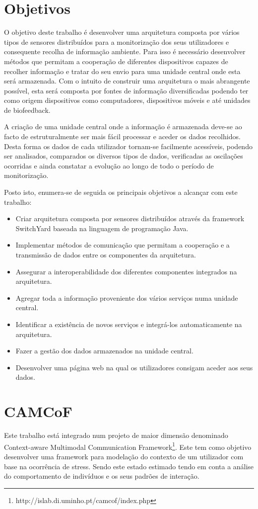 \section{Objetivos}

O objetivo deste trabalho é desenvolver uma arquitetura composta por vários tipos de sensores distribuídos para a monitorização dos seus utilizadores e consequente recolha de informação ambiente. Para isso é necessário desenvolver métodos que permitam a cooperação de diferentes dispositivos capazes de recolher informação e tratar do seu envio para uma unidade central onde esta será armazenada. Com o intuito de construir uma arquitetura o mais abrangente possível, esta será composta por fontes de informação diversificadas podendo ter como origem dispositivos como computadores, dispositivos móveis e até unidades de biofeedback.

A criação de uma unidade central onde a informação é armazenada deve-se ao facto de estruturalmente ser mais fácil processar e aceder os dados recolhidos. Desta forma os dados de cada utilizador tornam-se facilmente acessíveis, podendo ser analisados, comparados os diversos tipos de dados, verificadas as oscilações ocorridas e ainda constatar a evolução ao longo de todo o período de monitorização.

Posto isto, enumera-se de seguida os principais objetivos a alcançar com este trabalho:
\begin{itemize}
  \item Criar arquitetura composta por sensores distribuídos através da framework SwitchYard baseada na linguagem de programação Java.
  \item Implementar métodos de comunicação que permitam a cooperação e a transmissão de dados entre os componentes da arquitetura.
  \item Assegurar a interoperabilidade dos diferentes componentes integrados na arquitetura.
  \item Agregar toda a informação proveniente dos vários serviços numa unidade central.
  \item Identificar a existência de novos serviços e integrá-los automaticamente na arquitetura.
  \item Fazer a gestão dos dados armazenados na unidade central.
  \item Desenvolver uma página web na qual os utilizadores consigam aceder aos seus dados.
  \end{itemize}


\section{CAMCoF}
Este trabalho está integrado num projeto de maior dimensão denominado Context-aware Multimodal Communication Framework\footnote{http://islab.di.uminho.pt/camcof/index.php}. Este tem como objetivo desenvolver uma framework para modelação do contexto de um utilizador com base na ocorrência de stress. Sendo este estado estimado tendo em conta a análise do comportamento de indivíduos e os seus padrões de interação.

